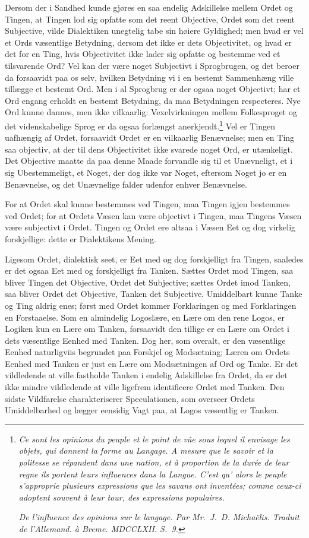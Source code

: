 \documentclass[12pt]{book}
\newcommand{\opage}[1]{\marginnote{\footnotesize\textit{[#1]}}}
\begin{document}
Dersom der i Sandhed kunde gjøres en saa endelig Adskillelse mellem Ordet og Tingen, at Tingen lod sig opfatte som det reent Objective, Ordet som det reent Subjective, vilde Dialektiken unegtelig tabe sin høiere Gyldighed; men hvad er vel et Ords væsentlige Betydning, dersom det ikke er dets Objectivitet, og hvad er det for en Ting, hvis Objectivitet ikke lader sig opfatte og bestemme ved et tilsvarende Ord? Vel kan der være noget Subjectivt i Sprogbrugen, og det beroer da forsaavidt paa os selv, hvilken Betydning vi i en bestemt Sammenhæng ville tillægge et bestemt Ord. Men i al Sprogbrug er der ogsaa noget Objectivt; har et Ord engang erholdt en bestemt Betydning, da maa Betydningen respecteres. Nye Ord kunne dannes, men ikke vilkaarlig:
\opage{10}Vexelvirkningen mellem Folkesproget og det videnskabelige Sprog er da ogsaa forlængst anerkjendt.\footnote{\textit{Ce sont les opinions du peuple et le point de vûe sous lequel il envisage les objets, qui donnent la forme au Langage. A mesure que le savoir et la politesse se répandent dans une nation, et à proportion de la durée de leur regne ils portent leurs influences dans la Langue. C'est qu' alors le peuple s'approprie plusieurs expressions que les savans ont inventées; comme ceux-ci adoptent souvent à leur tour, des expressions populaires.}

\textit{De l'influence des opinions sur le langage. Par Mr.\ J.\ D. Michaëlis. Traduit de l'Allemand. à Breme. MDCCLXII. S.~9.}}%
Vel er Tingen uafhængig af Ordet, forsaavidt Ordet er en vilkaarlig Benævnelse; men en Ting saa objectiv, at der til dens Objectivitet ikke svarede noget Ord, er utænkeligt. Det Objective maatte da paa denne Maade forvandle sig til et Unævneligt, et i sig Ubestemmeligt, et Noget, der dog ikke var Noget, eftersom Noget jo er en Benævnelse, og det Unævnelige falder udenfor enhver Benævnelse.

For at Ordet skal kunne bestemmes ved Tingen, maa Tingen igjen bestemmes ved Ordet; for at Ordets Væsen kan være objectivt i Tingen, maa Tingens Væsen være subjectivt i Ordet. Tingen og Ordet ere altsaa i Væsen Eet og dog virkelig forskjellige: dette er Dialektikens Mening.

Ligesom Ordet, dialektisk seet, er Eet med og dog forskjelligt fra Tingen, saaledes er det ogsaa Eet med og forskjelligt fra Tanken. Sættes Ordet mod Tingen, saa bliver Tingen det Objective, Ordet det Subjective; sættes Ordet imod Tanken, saa bliver Ordet det Objective, Tanken det Subjective. Umiddelbart kunne Tanke og Ting aldrig enes; først med Ordet kommer Forklaringen og med Forklaringen en Forstaaelse. Som en almindelig Logoslære, en Lære om den rene Logos, er Logiken kun en Lære om Tanken, forsaavidt den tillige er en Lære om Ordet i dets væsentlige
\opage{11}Eenhed med Tanken. Dog her, som overalt, er den væsentlige Eenhed naturligviis begrundet paa Forskjel og Modsætning; Læren om Ordets Eenhed med Tanken er just en Lære om Modsætningen af Ord og Tanke. Er det vildledende at ville fastholde Tanken i endelig Adskillelse fra Ordet, da er det ikke mindre vildledende at ville ligefrem identificere Ordet med Tanken. Den sidste Vildfarelse charakteriserer Speculationen, som overseer Ordets Umiddelbarhed og lægger eensidig Vagt paa, at Logos væsentlig er Tanken.
\end{document}
